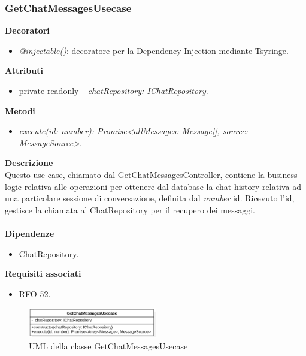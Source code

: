 \subsubsection{GetChatMessagesUsecase}
\textbf{Decoratori}
\begin{itemize}
    \item \textit{@injectable()}: decoratore per la Dependency Injection mediante Tsyringe.
\end{itemize}
\textbf{Attributi}
\begin{itemize}
    \item private readonly \textit{\_chatRepository: IChatRepository}.
\end{itemize}
\textbf{Metodi}
\begin{itemize}
    \item \textit{execute(id: number): Promise<allMessages: Message[], source: MessageSource>}.
\end{itemize}
\textbf{Descrizione}\\
Questo use case, chiamato dal GetChatMessagesController, contiene la business logic relativa alle operazioni per ottenere dal database la chat history relativa ad una particolare sessione di conversazione, definita dal \textit{number} id. Ricevuto l'id, gestisce la chiamata al ChatRepository per il recupero dei messaggi.\\ \\
\textbf{Dipendenze}
\begin{itemize}
    \item ChatRepository.
\end{itemize}
\textbf{Requisiti associati}
\begin{itemize}
    \item RFO-52.
\end{itemize}

\begin{figure}[h!]
    \centering  
    \includegraphics[width=0.5\textwidth]{GetChatMessagesUsecase.png}
    \caption{UML della classe GetChatMessagesUsecase}
\end{figure}

